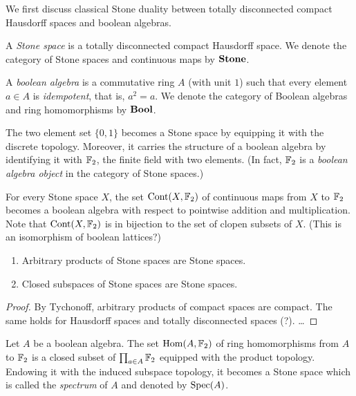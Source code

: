 \documentclass{notes}
\begin{document}
{\lukas
We first discuss classical Stone duality between totally disconnected compact Hausdorff spaces and boolean algebras.

\begin{definition}
  A \emph{Stone space} is a totally disconnected compact Hausdorff space.
  We denote the category of Stone spaces and continuous maps by \(\mathbf{Stone}\).
\end{definition}

\begin{definition}
  A \emph{boolean algebra} is a commutative ring \(A\) (with unit \(1\)) such that every element \(a\in A\) is \emph{idempotent}, that is, \(a^2=a\).
  We denote the category of Boolean algebras and ring homomorphisms by \(\mathbf{Bool}\).
\end{definition}

\begin{example}
  The two element set \(\{0,1\}\) becomes a Stone space by equipping it with the discrete topology.
  Moreover, it carries the structure of a boolean algebra by identifying it with \({\mathbb{F}}_2\), the finite field with two elements.
  (In fact, \({\mathbb{F}}_2\) is a \emph{boolean algebra object} in the category of Stone spaces.)
\end{example}

\begin{example}
  For every Stone space \(X\), the set \({\rm Cont}(X,{\mathbb{F}}_2)\) of continuous maps from \(X\) to \({\mathbb{F}}_2\) becomes a boolean algebra with respect to pointwise addition and multiplication.
  Note that \({\rm Cont}(X,{\mathbb{F}}_2)\) is in bijection to the set of clopen subsets of \(X\).
  (This is an isomorphism of boolean lattices?)
\end{example}

\begin{lemma}
	\label{lem:stone-spaces}
  \leavevmode
  \begin{enumerate}
    \item
      Arbitrary products of Stone spaces are Stone spaces.
    \item
      Closed subspaces of Stone spaces are Stone spaces.
  \end{enumerate}
\end{lemma}
\begin{proof}
  By Tychonoff, arbitrary products of compact spaces are compact.
  The same holds for Hausdorff spaces and totally disconnected spaces (?).
  \dots
\end{proof}

\begin{example}
  Let \(A\) be a boolean algebra.
  The set \(\mathrm{Hom}(A,{\mathbb{F}}_2)\) of ring homomorphisms from \(A\) to \({\mathbb{F}}_2\) is a closed subset of \(\prod_{a\in A}{\mathbb{F}}_2\) equipped with the product topology.
  Endowing it with the induced subspace topology, it becomes a Stone space which is called the \emph{spectrum} of \(A\) and denoted by \(\operatorname{Spec}(A)\).


\end{example}}
\end{document}
